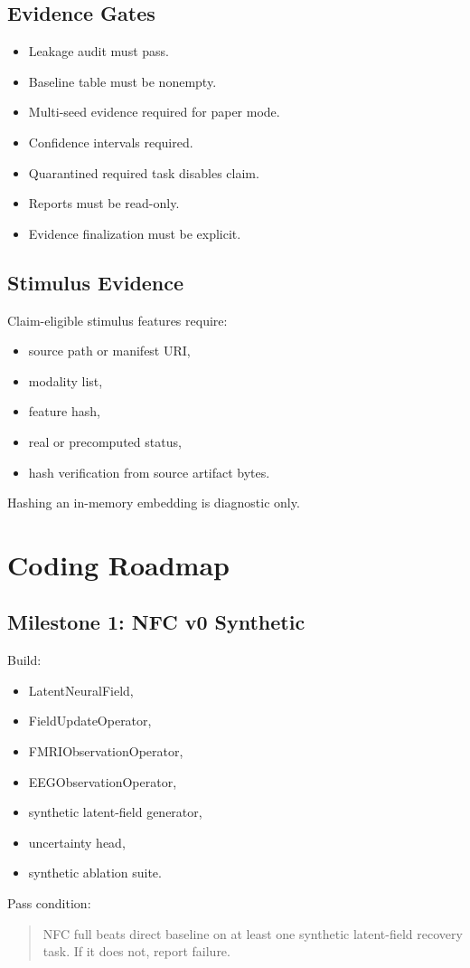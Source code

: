 \documentclass[11pt]{article}
\begin{document}
\subsection{Evidence Gates}
\begin{itemize}
\item Leakage audit must pass.
\item Baseline table must be nonempty.
\item Multi-seed evidence required for paper mode.
\item Confidence intervals required.
\item Quarantined required task disables claim.
\item Reports must be read-only.
\item Evidence finalization must be explicit.
\end{itemize}

\subsection{Stimulus Evidence}
Claim-eligible stimulus features require:
\begin{itemize}
\item source path or manifest URI,
\item modality list,
\item feature hash,
\item real or precomputed status,
\item hash verification from source artifact bytes.
\end{itemize}
Hashing an in-memory embedding is diagnostic only.

\section{Coding Roadmap}

\subsection{Milestone 1: NFC v0 Synthetic}
Build:
\begin{itemize}
\item LatentNeuralField,
\item FieldUpdateOperator,
\item FMRIObservationOperator,
\item EEGObservationOperator,
\item synthetic latent-field generator,
\item uncertainty head,
\item synthetic ablation suite.
\end{itemize}
Pass condition:
\begin{quote}
NFC full beats direct baseline on at least one synthetic latent-field recovery task. If it does not, report failure.
\end{quote}
\end{document}
